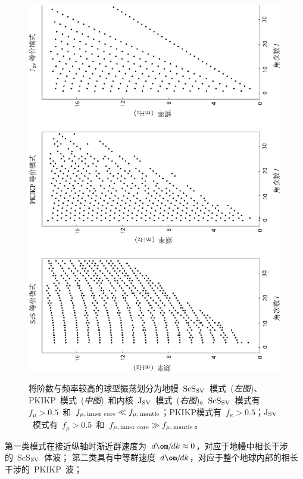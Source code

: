 {\begin{figure}
{\includegraphics{../figures/chap08/fig12.eps}
}
\caption[threemodes]{
将阶数与频率较高的球型振荡划分为地幔~${\rm ScS}_{\rm SV}$~模式~({\em 左图\/})、PKIKP~模式~({\em 中图\/})~和内核~${\rm J}_{\rm SV}$~模式~({\em 右图\/})。${\rm ScS}_{\rm SV}$~模式有~$f_{\mu}>0.5$~和~$f_{\mu,\mbox{\scriptsize\,inner core}}\ll f_{\mu,\mbox{\scriptsize\,mantle}}$；PKIKP模式有~$f_{\kappa}>0.5$；${\rm J}_{\rm SV}$~模式有~$f_{\mu}>0.5$~和~$f_{\mu,\mbox{\scriptsize\,inner core}}\gg f_{\mu,\mbox{\scriptsize\,mantle}}$。
}
\label{fig:threemodes}
\end{figure}
第一类模式在接近纵轴时渐近群速度为~$d\om\hspace{-0.2 mm}/\hspace{-0.3 mm}dk\approx 0$，对应于地幔中相长干涉的~ScS${}_{\rm SV}$~体波；
%
%
第二类具有中等群速度~$d\om\hspace{-0.2 mm}/\hspace{-0.3 mm}dk$，对应于整个地球内部的相长干涉的~PKIKP~波；
}

